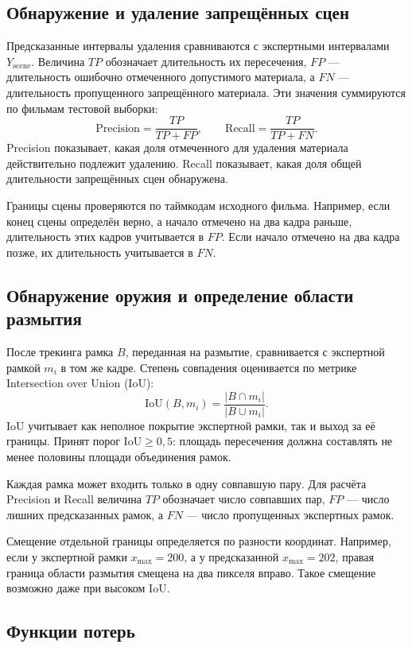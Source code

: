 \documentclass[a4paper,14pt]{extarticle}
\begin{document}
    \subsection{Обнаружение и удаление запрещённых сцен}
    Предсказанные интервалы удаления сравниваются с экспертными интервалами $Y_{\text{scene}}$. 
    Величина $TP$ обозначает длительность их пересечения, $FP$ --- длительность ошибочно отмеченного допустимого материала, а $FN$ --- длительность пропущенного запрещённого материала. 
    Эти значения суммируются по фильмам тестовой выборки:
    \[
        \mathrm{Precision} = \frac{TP}{TP+FP},
        \qquad
        \mathrm{Recall} = \frac{TP}{TP+FN}.
    \]
    Precision показывает, какая доля отмеченного для удаления материала действительно подлежит удалению. 
    Recall показывает, какая доля общей длительности запрещённых сцен обнаружена.

    Границы сцены проверяются по таймкодам исходного фильма. 
    Например, если конец сцены определён верно, а начало отмечено на два кадра раньше, длительность этих кадров учитывается в $FP$. 
    Если начало отмечено на два кадра позже, их длительность учитывается в $FN$.

    \subsection{Обнаружение оружия и определение области размытия}
    После трекинга рамка $B$, переданная на размытие, сравнивается с экспертной рамкой $m_i$ в том же кадре. 
    Степень совпадения оценивается по метрике Intersection over Union (IoU):
    \[
        \mathrm{IoU}(B,m_i) = \frac{|B \cap m_i|}{|B \cup m_i|}.
    \]
    IoU учитывает как неполное покрытие экспертной рамки, так и выход за её границы. 
    Принят порог $\mathrm{IoU} \geq 0{,}5$: площадь пересечения должна составлять не менее половины площади объединения рамок.

    Каждая рамка может входить только в одну совпавшую пару. 
    Для расчёта Precision и Recall величина $TP$ обозначает число совпавших пар, $FP$ --- число лишних предсказанных рамок, а $FN$ --- число пропущенных экспертных рамок.

    Смещение отдельной границы определяется по разности координат. 
    Например, если у экспертной рамки $x_{\max}=200$, а у предсказанной $x_{\max}=202$, правая граница области размытия смещена на два пикселя вправо. 
    Такое смещение возможно даже при высоком IoU.

    \subsection{Функции потерь}
\end{document}
